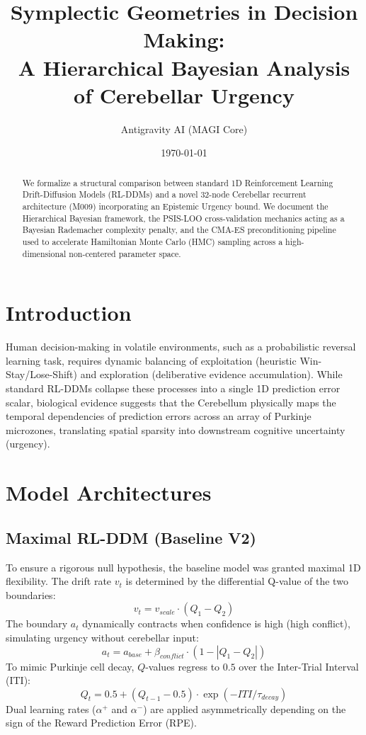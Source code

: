 \documentclass[11pt, a4paper]{article}
\title{\textbf{Symplectic Geometries in Decision Making: \\
A Hierarchical Bayesian Analysis of Cerebellar Urgency}}
\author{Antigravity AI (MAGI Core)}
\date{\today}
\begin{document}
\maketitle

\begin{abstract}
We formalize a structural comparison between standard 1D Reinforcement Learning Drift-Diffusion Models (RL-DDMs) and a novel 32-node Cerebellar recurrent architecture (M009) incorporating an Epistemic Urgency bound. We document the Hierarchical Bayesian framework, the PSIS-LOO cross-validation mechanics acting as a Bayesian Rademacher complexity penalty, and the CMA-ES preconditioning pipeline used to accelerate Hamiltonian Monte Carlo (HMC) sampling across a high-dimensional non-centered parameter space. 
\end{abstract}

\section{Introduction}
Human decision-making in volatile environments, such as a probabilistic reversal learning task, requires dynamic balancing of exploitation (heuristic Win-Stay/Lose-Shift) and exploration (deliberative evidence accumulation). While standard RL-DDMs collapse these processes into a single 1D prediction error scalar, biological evidence suggests that the Cerebellum physically maps the temporal dependencies of prediction errors across an array of Purkinje microzones, translating spatial sparsity into downstream cognitive uncertainty (urgency). 

\section{Model Architectures}

\subsection{Maximal RL-DDM (Baseline V2)}
To ensure a rigorous null hypothesis, the baseline model was granted maximal 1D flexibility. The drift rate $v_t$ is determined by the differential Q-value of the two boundaries:
\begin{equation}
v_t = v_{scale} \cdot (Q_1 - Q_2)
\end{equation}
The boundary $a_t$ dynamically contracts when confidence is high (high conflict), simulating urgency without cerebellar input:
\begin{equation}
a_t = a_{base} + \beta_{conflict} \cdot (1 - |Q_1 - Q_2|)
\end{equation}
To mimic Purkinje cell decay, $Q$-values regress to $0.5$ over the Inter-Trial Interval (ITI):
\begin{equation}
Q_{t} = 0.5 + (Q_{t-1} - 0.5) \cdot \exp(-ITI / \tau_{decay})
\end{equation}
Dual learning rates ($\alpha^+$ and $\alpha^-$) are applied asymmetrically depending on the sign of the Reward Prediction Error (RPE). 
\end{document}
